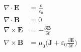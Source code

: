 \documentclass[12pt]{standalone}
\begin{document}
$\displaystyle\begin{aligned}
\nabla \cdot \mathbf{E} &=\frac{\rho }{\varepsilon_{0}}\\
 \nabla \cdot \mathbf{B} &=0\\
\nabla \times \mathbf{E} &=-\frac{\partial \mathbf{B}}{\partial t}\\
\nabla \times \mathbf{B} & = \mu_{0}\Big(\mathbf{J} +\varepsilon_{0}{\frac{\partial \mathbf{E} }{\partial t}}\Big)
\end{aligned}$
\end{document}
